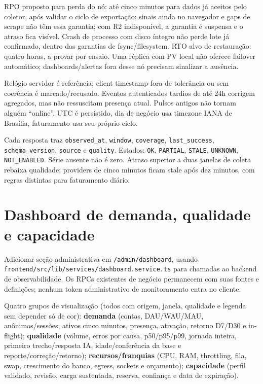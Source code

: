 \documentclass[10pt,a4paper]{article}
\begin{document}
RPO proposto para perda do nó: até cinco minutos para dados já aceitos
pelo coletor, após validar o ciclo de exportação; sinais ainda no
navegador e gaps de scrape não têm essa garantia; com R2 indisponível, a
garantia é suspensa e o atraso fica visível. Crash de processo com disco
íntegro não perde lote já confirmado, dentro das garantias de
fsync/filesystem. RTO alvo de restauração: quatro horas, a provar por
ensaio. Uma réplica com PV local não oferece failover automático;
dashboards/alertas fora desse nó precisam sinalizar a ausência.

Relógio servidor é referência; client timestamp fora de tolerância ou
sem coerência é marcado/recusado. Eventos autenticados tardios de até
24h corrigem agregados, mas não ressuscitam presença atual. Pulsos
antigos não tornam alguém ``online''. UTC é persistido, dia de negócio
usa timezone IANA de Brasília, faturamento usa seu próprio ciclo.

Cada resposta traz {\footnotesize\ttfamily\nolinkurl{observed_at}}, {\footnotesize\ttfamily\nolinkurl{window}},
{\footnotesize\ttfamily\nolinkurl{coverage}}, {\footnotesize\ttfamily\nolinkurl{last_success}}, {\footnotesize\ttfamily\nolinkurl{schema_version}},
{\footnotesize\ttfamily\nolinkurl{source}} e {\footnotesize\ttfamily\nolinkurl{quality}}. Estados: {\footnotesize\ttfamily\nolinkurl{OK}},
{\footnotesize\ttfamily\nolinkurl{PARTIAL}}, {\footnotesize\ttfamily\nolinkurl{STALE}}, {\footnotesize\ttfamily\nolinkurl{UNKNOWN}},
{\footnotesize\ttfamily\nolinkurl{NOT_ENABLED}}. Série ausente não é zero. Atraso superior a duas
janelas de coleta rebaixa qualidade; providers de cinco minutos ficam
stale após dez minutos, com regras distintas para faturamento diário.

\clearpage
\section{Dashboard de demanda, qualidade e
capacidade}\label{dashboard-de-demanda-qualidade-e-capacidade}

Adicionar seção administrativa em {\footnotesize\ttfamily\nolinkurl{/admin/dashboard}}, usando
{\footnotesize\ttfamily\nolinkurl{frontend/src/lib/services/dashboard.service.ts}} para chamadas ao
backend de observabilidade. Os RPCs existentes de negócio permanecem com
suas fontes e definições; nenhum token administrativo de monitoramento
entra no cliente.

Quatro grupos de visualização (todos com origem, janela, qualidade e
legenda sem depender só de cor): \textbf{demanda} (contas, DAU/WAU/MAU,
anônimos/sessões, ativos cinco minutos, presença, ativação, retorno
D7/D30 e in-flight); \textbf{qualidade} (volume, erros por causa,
p50/p95/p99, jornada inteira, primeiro trecho/resposta IA,
idade/conferência da base e reporte/correção/retorno);
\textbf{recursos/franquias} (CPU, RAM, throttling, fila, swap,
crescimento do banco, egress, sockets e orçamento); \textbf{capacidade}
(perfil validado, revisão, carga sustentada, reserva, confiança e data
de expiração).
\end{document}
